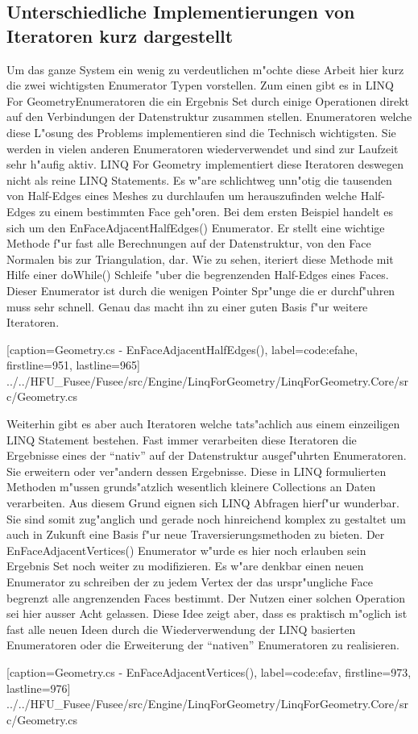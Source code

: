\documentclass[pagesize, paper=a4, fontsize=12pt,titlepage=true, headings=small, headnosepline, abstractoff, liststotoc, nochapterprefix, plainheadsepline]{scrreprt}
\newcommand{\LFG}{LINQ For Geometry}
\newcommand{\LFGS}{LINQ For Geometry }
\begin{document}
		\subsection {Unterschiedliche Implementierungen von Iteratoren kurz dargestellt}
			Um das ganze System ein wenig zu verdeutlichen m"ochte diese Arbeit hier kurz die zwei wichtigsten Enumerator Typen vorstellen. Zum einen gibt es in \LFG Enumeratoren die ein Ergebnis Set durch einige Operationen direkt auf den Verbindungen der Datenstruktur zusammen stellen. Enumeratoren welche diese L"osung des Problems implementieren sind die Technisch wichtigsten. Sie werden in vielen anderen Enumeratoren wiederverwendet und sind zur Laufzeit sehr h"aufig aktiv. \LFGS implementiert diese Iteratoren deswegen nicht als reine LINQ Statements. Es w"are schlichtweg unn"otig die tausenden von Half-Edges eines Meshes zu durchlaufen um herauszufinden welche Half-Edges zu einem bestimmten Face geh"oren. Bei dem ersten Beispiel handelt es sich um den EnFaceAdjacentHalfEdges() Enumerator. Er stellt eine wichtige Methode f"ur fast alle Berechnungen auf der Datenstruktur, von den Face Normalen bis zur Triangulation, dar. Wie zu sehen, iteriert diese Methode mit Hilfe einer do{}While() Schleife "uber die begrenzenden Half-Edges eines Faces. Dieser Enumerator ist durch die wenigen Pointer Spr"unge die er durchf"uhren muss sehr schnell. Genau das macht ihn zu einer guten Basis f"ur weitere Iteratoren.


			[caption={Geometry.cs - EnFaceAdjacentHalfEdges()}, label=code:efahe, firstline=951, lastline=965]
			{../../HFU_Fusee/Fusee/src/Engine/LinqForGeometry/LinqForGeometry.Core/src/Geometry.cs}

Weiterhin gibt es aber auch Iteratoren welche tats"achlich aus einem einzeiligen LINQ Statement bestehen. Fast immer verarbeiten diese Iteratoren die Ergebnisse eines der "`nativ"' auf der Datenstruktur ausgef"uhrten Enumeratoren. Sie erweitern oder ver"andern dessen Ergebnisse. Diese in LINQ formulierten Methoden m"ussen grunds"atzlich wesentlich kleinere Collections an Daten verarbeiten. Aus diesem Grund eignen sich LINQ Abfragen hierf"ur wunderbar. Sie sind somit zug"anglich und gerade noch hinreichend komplex zu gestaltet um auch in Zukunft eine Basis f"ur neue Traversierungsmethoden zu bieten.
Der EnFaceAdjacentVertices() Enumerator w"urde es hier noch erlauben sein Ergebnis Set noch weiter zu modifizieren. Es w"are denkbar einen neuen Enumerator zu schreiben der zu jedem Vertex der das urspr"ungliche Face begrenzt alle angrenzenden Faces bestimmt. Der Nutzen einer solchen Operation sei hier ausser Acht gelassen. Diese Idee zeigt aber, dass es praktisch m"oglich ist fast alle neuen Ideen durch die Wiederverwendung der LINQ basierten Enumeratoren oder die Erweiterung der "`nativen"' Enumeratoren zu realisieren.

			[caption={Geometry.cs - EnFaceAdjacentVertices()}, label=code:efav, firstline=973, lastline=976]
			{../../HFU_Fusee/Fusee/src/Engine/LinqForGeometry/LinqForGeometry.Core/src/Geometry.cs}
\end{document}
